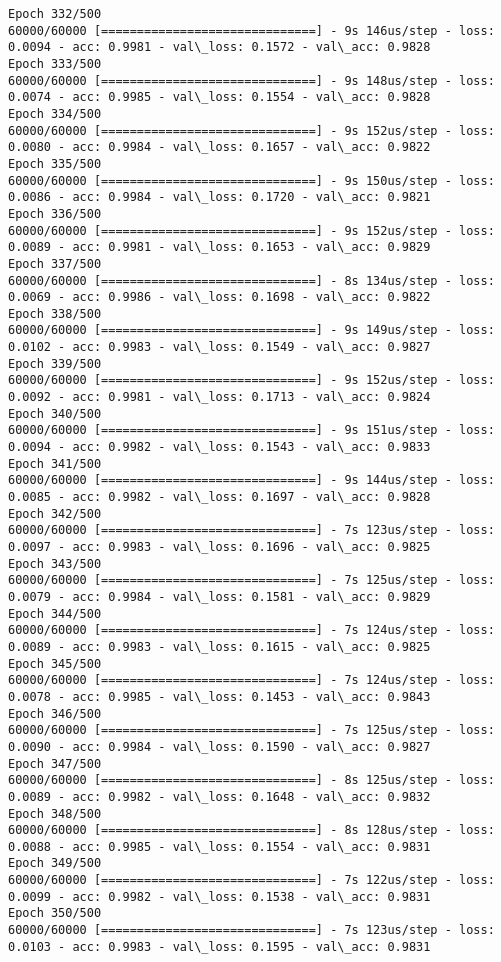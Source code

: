 \documentclass[11pt]{article}
\begin{document}
\begin{Verbatim}[commandchars=\\\{\}]
Epoch 332/500
60000/60000 [==============================] - 9s 146us/step - loss: 0.0094 - acc: 0.9981 - val\_loss: 0.1572 - val\_acc: 0.9828
Epoch 333/500
60000/60000 [==============================] - 9s 148us/step - loss: 0.0074 - acc: 0.9985 - val\_loss: 0.1554 - val\_acc: 0.9828
Epoch 334/500
60000/60000 [==============================] - 9s 152us/step - loss: 0.0080 - acc: 0.9984 - val\_loss: 0.1657 - val\_acc: 0.9822
Epoch 335/500
60000/60000 [==============================] - 9s 150us/step - loss: 0.0086 - acc: 0.9984 - val\_loss: 0.1720 - val\_acc: 0.9821
Epoch 336/500
60000/60000 [==============================] - 9s 152us/step - loss: 0.0089 - acc: 0.9981 - val\_loss: 0.1653 - val\_acc: 0.9829
Epoch 337/500
60000/60000 [==============================] - 8s 134us/step - loss: 0.0069 - acc: 0.9986 - val\_loss: 0.1698 - val\_acc: 0.9822
Epoch 338/500
60000/60000 [==============================] - 9s 149us/step - loss: 0.0102 - acc: 0.9983 - val\_loss: 0.1549 - val\_acc: 0.9827
Epoch 339/500
60000/60000 [==============================] - 9s 152us/step - loss: 0.0092 - acc: 0.9981 - val\_loss: 0.1713 - val\_acc: 0.9824
Epoch 340/500
60000/60000 [==============================] - 9s 151us/step - loss: 0.0094 - acc: 0.9982 - val\_loss: 0.1543 - val\_acc: 0.9833
Epoch 341/500
60000/60000 [==============================] - 9s 144us/step - loss: 0.0085 - acc: 0.9982 - val\_loss: 0.1697 - val\_acc: 0.9828
Epoch 342/500
60000/60000 [==============================] - 7s 123us/step - loss: 0.0097 - acc: 0.9983 - val\_loss: 0.1696 - val\_acc: 0.9825
Epoch 343/500
60000/60000 [==============================] - 7s 125us/step - loss: 0.0079 - acc: 0.9984 - val\_loss: 0.1581 - val\_acc: 0.9829
Epoch 344/500
60000/60000 [==============================] - 7s 124us/step - loss: 0.0089 - acc: 0.9983 - val\_loss: 0.1615 - val\_acc: 0.9825
Epoch 345/500
60000/60000 [==============================] - 7s 124us/step - loss: 0.0078 - acc: 0.9985 - val\_loss: 0.1453 - val\_acc: 0.9843
Epoch 346/500
60000/60000 [==============================] - 7s 125us/step - loss: 0.0090 - acc: 0.9984 - val\_loss: 0.1590 - val\_acc: 0.9827
Epoch 347/500
60000/60000 [==============================] - 8s 125us/step - loss: 0.0089 - acc: 0.9982 - val\_loss: 0.1648 - val\_acc: 0.9832
Epoch 348/500
60000/60000 [==============================] - 8s 128us/step - loss: 0.0088 - acc: 0.9985 - val\_loss: 0.1554 - val\_acc: 0.9831
Epoch 349/500
60000/60000 [==============================] - 7s 122us/step - loss: 0.0099 - acc: 0.9982 - val\_loss: 0.1538 - val\_acc: 0.9831
Epoch 350/500
60000/60000 [==============================] - 7s 123us/step - loss: 0.0103 - acc: 0.9983 - val\_loss: 0.1595 - val\_acc: 0.9831

\end{Verbatim}
\end{document}
